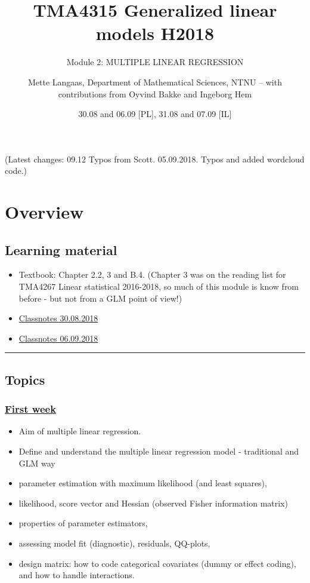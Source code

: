 \documentclass[
]{article}
\title{TMA4315 Generalized linear models H2018}
\subtitle{Module 2: MULTIPLE LINEAR REGRESSION}
\author{Mette Langaas, Department of Mathematical Sciences, NTNU -- with
contributions from Oyvind Bakke and Ingeborg Hem}
\date{30.08 and 06.09 {[}PL{]}, 31.08 and 07.09 {[}IL{]}}
\providecommand{\tightlist}{%
  \setlength{\itemsep}{0pt}\setlength{\parskip}{0pt}}
\begin{document}
\maketitle

{
\setcounter{tocdepth}{2}
\tableofcontents
}
(Latest changes: 09.12 Typos from Scott. 05.09.2018. Typos and added
wordcloud code.)

\hypertarget{overview}{%
\section{Overview}\label{overview}}

\hypertarget{learning-material}{%
\subsection{Learning material}\label{learning-material}}

\begin{itemize}
\tightlist
\item
  Textbook: Chapter 2.2, 3 and B.4. (Chapter 3 was on the reading list
  for TMA4267 Linear statistical 2016-2018, so much of this module is
  know from before - but not from a GLM point of view!)
\item
  \href{https://www.math.ntnu.no/emner/TMA4315/2018h/TMA4315M2H20180830.pdf}{Classnotes
  30.08.2018}
\item
  \href{https://www.math.ntnu.no/emner/TMA4315/2018h/TMA4315M2H20180906.pdf}{Classnotes
  06.09.2018}
\end{itemize}

\begin{center}\rule{0.5\linewidth}{0.5pt}\end{center}

\hypertarget{topics}{%
\subsection{Topics}\label{topics}}

\hypertarget{first-week}{%
\subsubsection{\texorpdfstring{\protect\hyperlink{firstweek}{First
week}}{First week}}\label{first-week}}

\begin{itemize}
\tightlist
\item
  Aim of multiple linear regression.
\item
  Define and understand the multiple linear regression model -
  traditional and GLM way
\item
  parameter estimation with maximum likelihood (and least squares),
\item
  likelihood, score vector and Hessian (observed Fisher information
  matrix)
\item
  properties of parameter estimators,
\item
  assessing model fit (diagnostic), residuals, QQ-plots,
\item
  design matrix: how to code categorical covariates (dummy or effect
  coding), and how to handle interactions.
\end{itemize}
\end{document}
